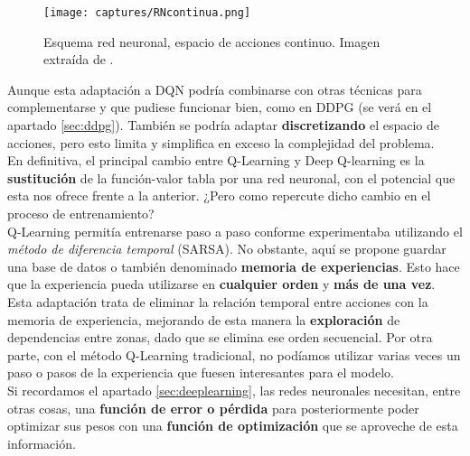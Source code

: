 \documentclass[11pt,fleqn]{book} %
\begin{document}
\begin{figure}[H]
	\centering\texttt{[image: captures/RNcontinua.png]}
	\caption{Esquema red neuronal, espacio de acciones continuo. Imagen extraída de \cite{article:RLromero}.}
	\label{fig:RNcontinua} %
\end{figure}

Aunque esta adaptación a DQN podría combinarse con otras técnicas para complementarse y que pudiese funcionar bien, como en DDPG (se verá en el apartado \ref{sec:ddpg}). También se podría adaptar \textbf{discretizando} el espacio de acciones, pero esto limita y simplifica en exceso la complejidad del problema. \\


En definitiva, el principal cambio entre Q-Learning y Deep Q-learning es la \textbf{sustitución} de la función-valor tabla por una red neuronal, con el potencial que esta nos ofrece frente a la anterior. ¿Pero como repercute dicho cambio en el proceso de entrenamiento? \\

Q-Learning permitía entrenarse paso a paso conforme experimentaba utilizando el \textit{método de diferencia temporal} (SARSA). No obstante, aquí se propone guardar una base de datos o también denominado \textbf{memoria de experiencias}. Esto hace que la experiencia pueda utilizarse en \textbf{cualquier orden} y \textbf{más de una vez}.\\

Esta adaptación trata de eliminar la relación temporal entre acciones con la memoria de experiencia, mejorando de esta manera la \textbf{exploración} de dependencias entre zonas, dado que se elimina ese orden secuencial. Por otra parte, con el método Q-Learning tradicional, no podíamos utilizar varias veces un paso o pasos de la experiencia que fuesen interesantes para el modelo. \\

Si recordamos el apartado \ref{sec:deeplearning}, las redes neuronales necesitan, entre otras cosas, una \textbf{función de error o pérdida} para posteriormente poder optimizar sus pesos con una \textbf{función de optimización} que se aproveche de esta información. \\
\end{document}
